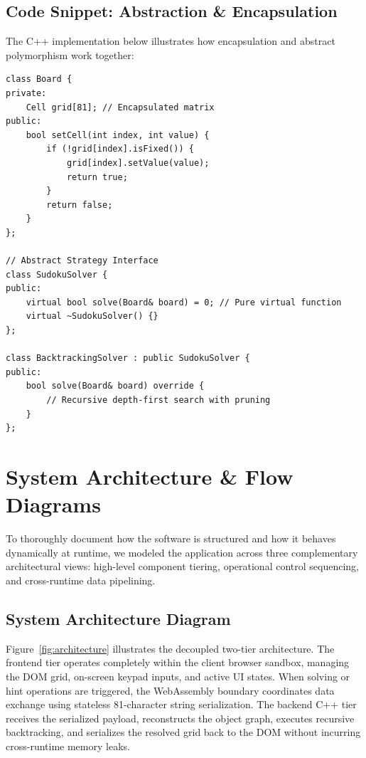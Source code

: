 \documentclass[12pt,a4paper,oneside]{book}
\begin{document}
\subsection{Code Snippet: Abstraction \& Encapsulation}
The C++ implementation below illustrates how encapsulation and abstract polymorphism work together:

\begin{lstlisting}
class Board {
private:
    Cell grid[81]; // Encapsulated matrix
public:
    bool setCell(int index, int value) {
        if (!grid[index].isFixed()) {
            grid[index].setValue(value);
            return true;
        }
        return false;
    }
};

// Abstract Strategy Interface
class SudokuSolver {
public:
    virtual bool solve(Board& board) = 0; // Pure virtual function
    virtual ~SudokuSolver() {}
};

class BacktrackingSolver : public SudokuSolver {
public:
    bool solve(Board& board) override {
        // Recursive depth-first search with pruning
    }
};
\end{lstlisting}

\section{System Architecture \& Flow Diagrams}
To thoroughly document how the software is structured and how it behaves dynamically at runtime, we modeled the application across three complementary architectural views: high-level component tiering, operational control sequencing, and cross-runtime data pipelining.

\subsection{System Architecture Diagram}
Figure~\ref{fig:architecture} illustrates the decoupled two-tier architecture. The frontend tier operates completely within the client browser sandbox, managing the DOM grid, on-screen keypad inputs, and active UI states. When solving or hint operations are triggered, the WebAssembly boundary coordinates data exchange using stateless 81-character string serialization. The backend C++ tier receives the serialized payload, reconstructs the object graph, executes recursive backtracking, and serializes the resolved grid back to the DOM without incurring cross-runtime memory leaks.
\end{document}
